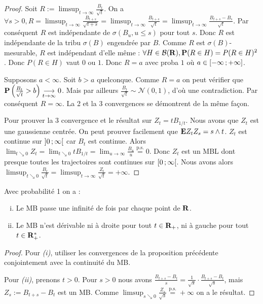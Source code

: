 	\begin{proof}
		Soit $R := \limsup_{t \to \infty} \frac{B_t}{\sqrt{t}}$.
		On a $\forall s > 0, R = \limsup_{t \to \infty} \frac{B_{t + s}}{\sqrt{t + s}} = \limsup_{t \to \infty} \frac{B_{t + s}}{\sqrt{t}} = \limsup_{t \to \infty} \frac{B_{t + s} - B_s}{\sqrt{t}}$.
		Par conséquent $R$ est indépendante de $\sigma(B_u, u \leq s)$ pour tout $s$.
		Donc $R$ est indépendante de la tribu $\sigma(B)$ engendrée par $B$.
		Comme $R$ est $\sigma(B)$-mesurable, $R$ est indépendant d'elle même : $\forall H \in \mathcal{B}(\mathbf{R}), \mathbf{P}(R \in H) = P(R \in H)^2$.
		Donc $P(R \in H)$ vaut $0$ ou $1$.
		Donc $R = a$ avec proba $1$ où $a \in \mathopen{}\mathclose{\left[-\infty\mathclose{}\mathpunct{};+\infty\right]}$.
		
		Supposons $a < \infty$.
		Soit $b > a$ quelconque.
		Comme $R = a$ on peut vérifier que $\mathbf{P} \left( \frac{B_t}{\sqrt{t}} > b \right) \underset{t \to \infty}{\longrightarrow} 0$.
		Mais par ailleurs $\frac{B_t}{\sqrt{t}} \sim \mathcal{N}(0,1)$, d'où une contradiction.
		Par conséquent $R = \infty$.
		La 2 et la 3 convergences se démontrent de la même façon.
		
		Pour prouver la 3 convergence et le résultat sur $Z_t = t B_{1/t}$.
		Nous avons que $Z_t$ est une gaussienne centrée.
		On peut prouver facilement que $\mathbf{E} Z_t Z_s = s \wedge t$.
		$Z_t$ est continue sur $\mathopen{}\mathclose{\left]0\mathclose{}\mathpunct{};\infty\right[}$ car $B_t$ est continue.
		Alors $\lim_{t \searrow 0} Z_t = \lim_{t \searrow 0} t B_{1/t} = \lim_{u \to \infty} \frac{B_u}{u} \overset{\text{p.s.}}{=} 0$.
		Donc $Z_t$ est un MBL dont presque toutes les trajectoires sont continues sur $\mathopen{}\mathclose{\left[0\mathclose{}\mathpunct{};\infty\right[}$.
		Nous avons alors $\limsup_{t \searrow 0} \frac{B_t}{\sqrt{t}} = \limsup_{t \to \infty} \frac{Z_t}{\sqrt{t}} = +\infty$.
	\end{proof}
	
	\begin{cor}
		Avec probabilité 1 on a :
		\begin{enumerate}[(i)]
			\item Le MB passe une infinité de fois par chaque point de $\mathbf{R}$.
			\item Le MB n'est dérivable ni à droite pour tout $t \in \mathbf{R}_+$, ni à gauche pour tout $t \in \mathbf{R}_+^*$.
		\end{enumerate}
	\end{cor}
	
	\begin{proof}
		Pour \textit{(i)}, utiliser les convergences de la proposition précédente conjointement avec la continuité du MB.
		
		Pour \textit{(ii)}, prenons $t > 0$.
		Pour $s > 0$ nous avons $\frac{B_{t+s} - B_t}{s} = \frac{1}{\sqrt{s}} \cdot \frac{B_{t+s} - B_t}{\sqrt{s}}$, mais $Z_s := B_{t + s} - B_t$ est un MB.
		Comme $\limsup_{s \searrow 0} \frac{Z_s}{\sqrt{s}} \overset{\text{p.s.}}{=} +\infty$ on a le résultat.
	\end{proof}


